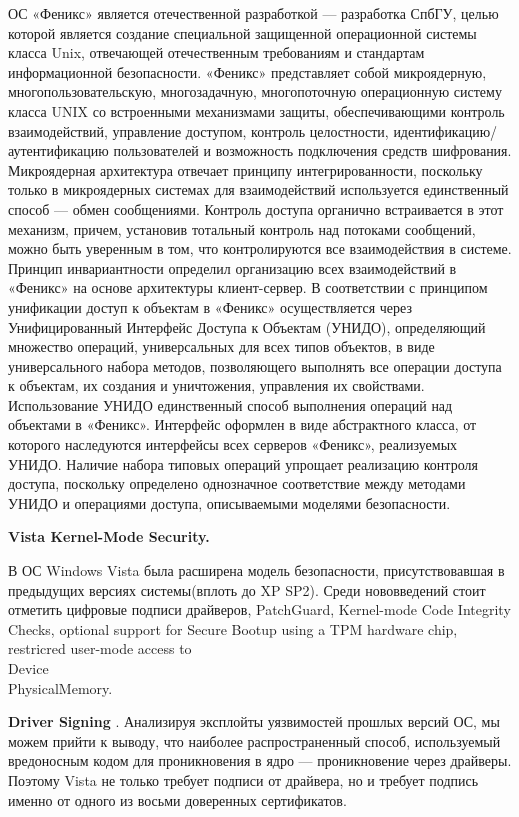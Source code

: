 ОС «Феникс» является отечественной разработкой — разработка СпбГУ, целью которой является создание специальной защищенной операционной системы класса Unix, отвечающей отечественным требованиям и стандартам информационной безопасности. «Феникс» представляет собой микроядерную, многопользовательскую, многозадачную, многопоточную операционную систему класса UNIX со встроенными механизмами защиты, обеспечивающими контроль взаимодействий, управление доступом, контроль целостности, идентификацию/аутентификацию пользователей и возможность подключения средств шифрования. Микроядерная архитектура отвечает принципу интегрированности, поскольку только в микроядерных системах для взаимодействий используется единственный способ — обмен сообщениями. Контроль доступа органично встраивается в этот механизм, причем, установив тотальный контроль над потоками сообщений, можно быть уверенным в том, что контролируются все взаимодействия в системе. Принцип инвариантности определил организацию всех взаимодействий в «Феникс» на основе архитектуры клиент-сервер. В соответствии с принципом унификации доступ к объектам в «Феникс» осуществляется через Унифицированный Интерфейс Доступа к Объектам (УНИДО), определяющий множество операций, универсальных для всех типов объектов, в виде универсального набора методов, позволяющего выполнять все операции доступа к объектам, их создания и уничтожения, управления их свойствами. Использование УНИДО единственный способ выполнения операций над объектами в «Феникс». Интерфейс оформлен в виде абстрактного класса, от которого наследуются интерфейсы всех серверов «Феникс», реализуемых УНИДО. Наличие набора типовых операций упрощает реализацию контроля доступа, поскольку определено однозначное соответствие между методами УНИДО и операциями доступа, описываемыми моделями безопасности. 

\bigskip
{\bfseries Vista Kernel-Mode Security.}

В ОС Windows Vista была расширена модель безопасности, присутствовавшая в предыдущих версиях системы(вплоть до XP SP2). Среди нововведений стоит отметить цифровые подписи драйверов, PatchGuard, Kernel-mode Code Integrity Checks, optional support for Secure Bootup using a TPM hardware chip, restricred user-mode access to \\ Device\\ PhysicalMemory. 

\bigskip
{\bfseries Driver Signing }. Анализируя эксплойты уязвимостей прошлых версий ОС, мы можем прийти к выводу, что наиболее распространенный способ, используемый вредоносным кодом для проникновения в ядро — проникновение через драйверы. Поэтому Vista не только требует подписи от драйвера, но и требует подпись именно от одного из восьми доверенных сертификатов. 

